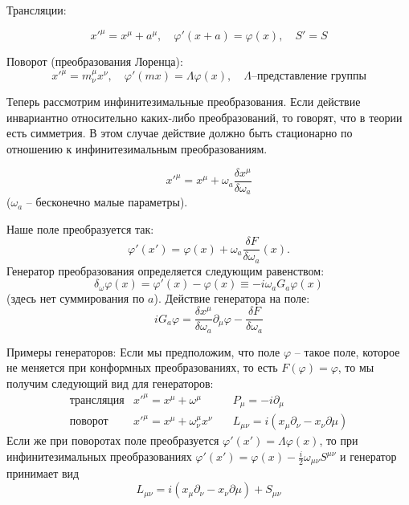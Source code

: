 \documentclass[a4paper,12pt]{article}
\theoremstyle{definition}
\theoremstyle{definition}
\theoremstyle{definition}
\begin{document}
Трансляции:

\begin{equation*}
  \label{eq:306}
  x'^{\mu}=x^{\mu}+a^{\mu},\quad \varphi'(x+a)=\varphi(x),\quad S'=S
\end{equation*}

Поворот (преобразования Лоренца):
\begin{equation*}
  x'^{\mu}=m^{\mu}_{\nu} x^{\nu}, \quad \varphi'(m x)=\Lambda \varphi(x),\quad \Lambda \mbox{--представление группы} 
\end{equation*}

Теперь рассмотрим инфинитезимальные преобразования.
Если действие инвариантно относительно каких-либо преобразований, то говорят, что в теории есть
симметрия. В этом случае действие должно быть стационарно по отношению к инфинитезимальным
преобразованиям. 

\begin{equation}
  \label{eq:165}
  x'^{\mu}=x^{\mu}+\omega_a \frac{\delta x^{\mu}}{\delta \omega_a}
\end{equation}
($\omega_{a}$ -- бесконечно малые параметры).

Наше поле преобразуется так:
\begin{equation}
  \label{eq:166}
  \varphi'(x')=\varphi(x)+\omega_a \frac{\delta F}{\delta \omega_a} (x).
\end{equation}
Генератор преобразования определяется следующим равенством:
\begin{equation}
  \label{eq:167}
  \delta_{\omega} \varphi(x)=\varphi'(x)-\varphi(x)\equiv -i\omega_a G_a \varphi(x)
\end{equation}
(здесь нет суммирования по $a$). Действие генератора на поле:
\begin{equation}
  \label{eq:168}
  iG_a \varphi=\frac{\delta x^{\mu}}{\delta\omega_a} \partial_{\mu}\varphi-\frac{\delta F}{\delta \omega_a}
\end{equation}

Примеры генераторов:
Если мы предположим, что поле $\varphi$ -- такое поле, которое не меняется при конформных
преобразованиях, то есть $F(\varphi)=\varphi$, то мы получим следующий вид для генераторов: 
\begin{eqnarray}
  \label{eq:169}
  \mbox{трансляция}  & x'^{\mu}=x^{\mu}+\omega^{\mu}& \quad P_{\mu}=-i\partial_{\mu}\\
  \mbox{поворот} & x'^{\mu}=x^{\mu}+\omega^{\mu}_{\nu}x^{\nu} & \quad L_{\mu\nu}=i(x_{\mu}\partial_{\nu}-x_{\nu}\partial{\mu})
\end{eqnarray}
Если же при поворотах поле преобразуется $\varphi'(x')=\Lambda\varphi(x)$, то при инфинитезимальных
преобразованиях $\varphi'(x')=\varphi(x)-\frac{i}{2}\omega_{\mu\nu}S^{\mu\nu}$ и генератор принимает
вид 
\begin{equation*}
  L_{\mu\nu}=i(x_{\mu}\partial_{\nu}-x_{\nu}\partial{\mu})+S_{\mu\nu}
\end{equation*}
\end{document}
